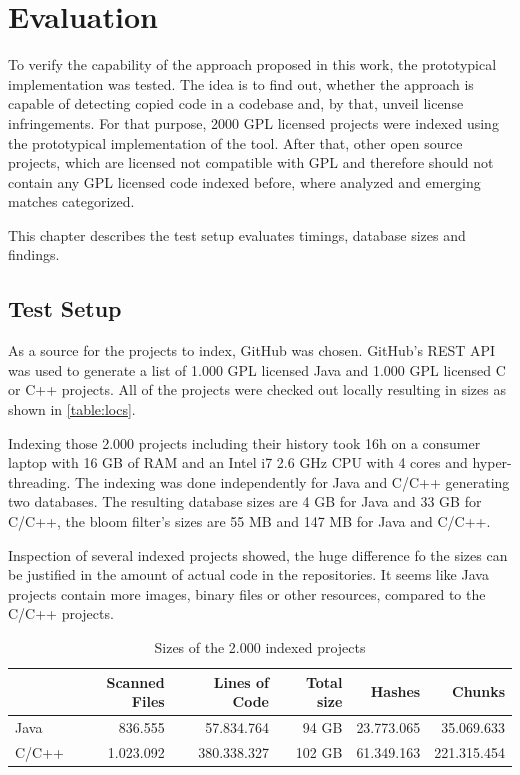 
\chapter{Evaluation}\label{chapter:evaluation}
To verify the capability of the approach proposed in this work, the prototypical implementation was tested.
The idea is to find out, whether the approach is capable of detecting copied code in a codebase and, by that, unveil license infringements.
For that purpose, 2000 GPL licensed projects were indexed using the prototypical implementation of the tool.
After that, other open source projects, which are licensed not compatible with GPL and therefore should not contain any GPL licensed code indexed before, where analyzed and emerging matches categorized.

This chapter describes the test setup evaluates timings, database sizes and findings.

\section{Test Setup}
As a source for the projects to index, GitHub was chosen.
GitHub's REST API was used to generate a list of 1.000 GPL licensed Java and 1.000 GPL licensed C or C++ projects.
All of the projects were checked out locally resulting in sizes as shown in \autoref{table:locs}.

Indexing those 2.000 projects including their history took 16h on a consumer laptop with 16 GB of RAM and an Intel i7 2.6 GHz CPU with 4 cores and hyper-threading.
The indexing was done independently for Java and C/C++ generating two databases.
The resulting database sizes are 4 GB for Java and 33 GB for C/C++, the bloom filter's sizes are 55 MB and 147 MB for Java and C/C++.

Inspection of several indexed projects showed, the huge difference fo the sizes can be justified in the amount of actual code in the repositories.
It seems like Java projects contain more images, binary files or other resources, compared to the C/C++ projects.

\begin{table}[ht]
	\centering
	\begin{tabular}{l|rrrrr}
		& \textbf{Scanned Files} & \textbf{Lines of Code} & \textbf{Total size} & \textbf{Hashes} & \textbf{Chunks} \\ 
		\hline 
		Java & 836.555 & 57.834.764 & 94 GB & 23.773.065 & 35.069.633 \\
		C/C++ & 1.023.092 & 380.338.327 & 102 GB & 61.349.163 & 221.315.454 \\ 
	\end{tabular}
	\caption{Sizes of the 2.000 indexed projects}\label{table:locs}
\end{table}


